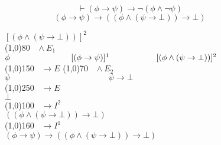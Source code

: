 \documentclass{article}
\theoremstyle{break}
\theoremstyle{break}
\theoremstyle{break}
\theoremstyle{break}
\begin{document}
\begin{figure}[H]
    \begin{exercise}[a casa]
        \[
            \vdash (\phi \to \psi) \to \neg (\phi \wedge \neg \psi)
        \] 
        \[
            (\phi \to \psi) \to ((\phi \wedge (\psi \to \bot)) \to \bot)
        \] 
        \begin{center}
            \hspace{-8cm}\( [(\phi \wedge (\psi \to \bot))]^2 \) \\
            \hspace{-7cm}\line(1,0){80}\(\;\;\; \wedge E_1 \) \hspace{4cm}\\
            \hspace{1cm}\( \phi \hspace{2.6cm}[(\phi \to \psi)]^1 \hspace{1cm} \hspace{1cm} [(\phi \wedge (\psi \to \bot))]^2\) \\
            \hspace{0.7cm}\line(1,0){150}\(\;\;\; \to E \) \hspace{0.8cm}\line(1,0){70}\(\;\;\; \wedge E_2 \)\\
            \hspace{2cm}\( \psi \hspace{5cm} \psi \to \bot\)\\ 
            \hspace{1cm}\line(1,0){250}\(\;\;\; \to E\)\\
            \( \bot \) \\
            \hspace{1cm}\line(1,0){100}\(\;\;\; \to I^2 \)\\
            \( ((\phi \wedge (\psi \to \bot)) \to \bot) \) \\
            \hspace{1cm}\line(1,0){160}\(\;\;\; \to I^1 \)\\
            \( (\phi \to \psi) \to ((\phi \wedge (\psi \to \bot)) \to \bot) \)
        \end{center}
    \end{exercise}
\end{figure}
\end{document}
